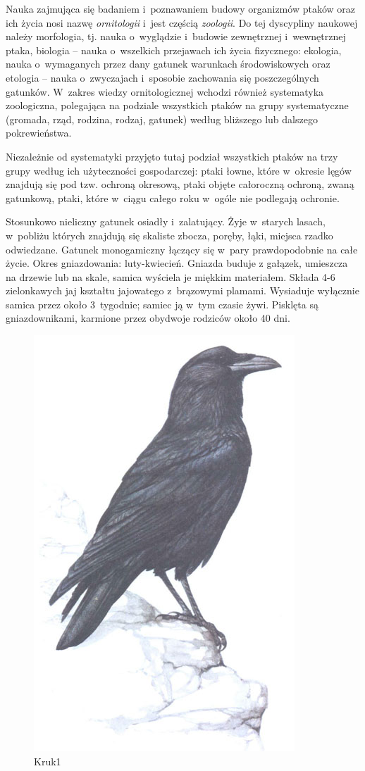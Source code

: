 \documentclass[a4paper,10pt]{report}
\begin{document}
Nauka zajmująca się badaniem i~poznawaniem budowy organizmów ptaków oraz ich życia nosi nazwę \emph{ornitologii} i~jest częścią \emph{zoologii}. Do tej dyscypliny naukowej należy morfologia, tj. nauka o~wyglądzie i~budowie zewnętrznej i~wewnętrznej ptaka, biologia -- nauka o~wszelkich przejawach ich życia fizycznego: ekologia, nauka o~wymaganych przez dany gatunek warunkach środowiskowych oraz etologia -- nauka o~zwyczajach i~sposobie zachowania się poszczególnych gatunków. W~zakres wiedzy ornitologicznej wchodzi również systematyka zoologiczna, polegająca na podziale wszystkich ptaków na grupy systematyczne (gromada, rząd, rodzina, rodzaj, gatunek) według bliższego lub dalszego pokrewieństwa. 

Niezależnie od systematyki przyjęto tutaj podział wszystkich ptaków na trzy grupy według ich użyteczności gospodarczej: ptaki łowne, które w~okresie lęgów znajdują się pod tzw. ochroną okresową, ptaki objęte całoroczną ochroną, zwaną gatunkową, ptaki, które w~ciągu całego roku w~ogóle nie podlegają ochronie.


Stosunkowo nieliczny gatunek osiadły i~zalatujący. Żyje w~starych lasach, w~pobliżu których znajdują się skaliste zbocza, poręby, łąki, miejsca rzadko odwiedzane. Gatunek monogamiczny łączący się w~pary prawdopodobnie na całe życie. Okres gniazdowania: luty-kwiecień. Gniazda buduje z gałązek, umieszcza na drzewie lub na skale, samica wyściela je miękkim materiałem. Składa 4-6 zielonkawych jaj kształtu jajowatego z~brązowymi plamami. Wysiaduje wyłącznie samica przez około 3~tygodnie; samiec ją w~tym czasie żywi. Pisklęta są gniazdownikami, karmione przez obydwoje rodziców około 40 dni. 

\begin{figure}[ht]
\centerline{\includegraphics[scale=0.2]{kruk}}
\caption{Kruk1}
\end{figure}
\end{document}
